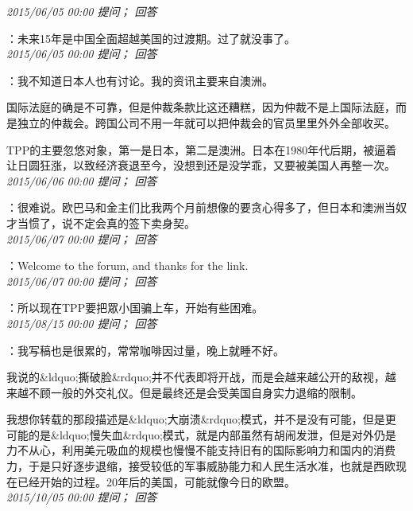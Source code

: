 \documentclass[twocolumn]{ctexart}
\begin{document}
\textit{\hfill\noindent\small 2015/06/05 00:00 提问； 回答}

：未来15年是中国全面超越美国的过渡期。过了就没事了。\\

\textit{\hfill\noindent\small 2015/06/05 00:00 提问； 回答}

：我不知道日本人也有讨论。我的资讯主要来自澳洲。

国际法庭的确是不可靠，但是仲裁条款比这还糟糕，因为仲裁不是上国际法庭，而是独立的仲裁会。跨国公司不用一年就可以把仲裁会的官员里里外外全部收买。

TPP的主要忽悠对象，第一是日本，第二是澳洲。日本在1980年代后期，被逼着让日圆狂涨，以致经济衰退至今，没想到还是没学乖，又要被美国人再整一次。\\

\textit{\hfill\noindent\small 2015/06/06 00:00 提问； 回答}

：很难说。欧巴马和金主们比我两个月前想像的要贪心得多了，但日本和澳洲当奴才当惯了，说不定会真的签下卖身契。\\

\textit{\hfill\noindent\small 2015/06/07 00:00 提问； 回答}

：Welcome to the forum, and thanks for the link.\\

\textit{\hfill\noindent\small 2015/06/07 00:00 提问； 回答}

：所以现在TPP要把眾小国骗上车，开始有些困难。\\

\textit{\hfill\noindent\small 2015/08/15 00:00 提问； 回答}

：我写稿也是很累的，常常咖啡因过量，晚上就睡不好。

我说的\&ldquo;撕破脸\&rdquo;并不代表即将开战，而是会越来越公开的敌视，越来越不顾一般的外交礼仪。但是最终还是会受美国自身实力退缩的限制。

我想你转载的那段描述是\&ldquo;大崩溃\&rdquo;模式，并不是没有可能，但是更可能的是\&ldquo;慢失血\&rdquo;模式，就是内部虽然有胡闹发泄，但是对外仍是力不从心，利用美元吸血的规模也慢慢不能支持旧有的国际影响力和国内的消费力，于是只好逐步退缩，接受较低的军事威胁能力和人民生活水准，也就是西欧现在已经开始的过程。20年后的美国，可能就像今日的欧盟。\\

\textit{\hfill\noindent\small 2015/10/05 00:00 提问； 回答}
\end{document}

